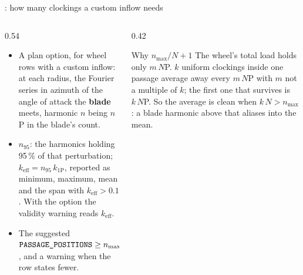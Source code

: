 \begin{frame}{: how many clockings a custom inflow needs}
\begin{columns}[T]
\begin{column}{0.54\textwidth}
\begin{itemize}\small
  \item A plan option, for  wheel rows with a custom
        inflow: at each radius, the Fourier series in azimuth of the angle
        of attack the \textbf{blade} meets, harmonic \(n\) being \(n\)P in the
        blade's count.
  \item \(n_{95}\): the harmonics holding 95\,\% of that perturbation;
        \(k_\mathrm{eff} = n_{95}\,k_\mathrm{1P}\), reported as minimum,
        maximum, mean and the span with \(k_\mathrm{eff} > 0.1\). With the
        option the validity warning reads \(k_\mathrm{eff}\).
  \item The suggested
        \( \texttt{PASSAGE\_POSITIONS} \ge n_\mathrm{max}/N + 1 \),
        and a warning when the row states fewer.
\end{itemize}
\end{column}
\begin{column}{0.42\textwidth}
\begin{block}{Why \(n_\mathrm{max}/N + 1\)}
\small The wheel's total load holds only \(m\,N\)P. \(k\) uniform clockings
inside one passage average away every \(m\,N\)P with \(m\) not a multiple of
\(k\); the first one that survives is \(k\,N\)P. So the average is clean when
\(k\,N > n_\mathrm{max}\): a blade harmonic above that aliases into the
mean.
\end{block}
\end{column}
\end{columns}
\end{frame}

